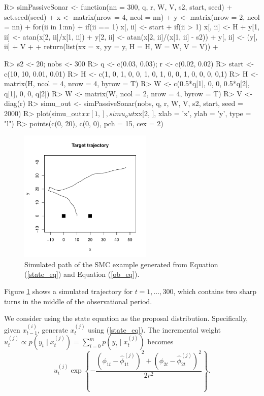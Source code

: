 \begin{example}
R> simPassiveSonar <- function(nn = 300, q, r, W, V, s2, start, seed){
+    set.seed(seed)
+    x <- matrix(nrow = 4, ncol = nn)
+    y <- matrix(nrow = 2, ncol = nn)
+    for(ii in 1:nn){    
+      if(ii == 1) x[, ii] <- start
+      if(ii > 1) x[, ii] <- H%
+      y[1, ii] <- atan(x[2, ii]/x[1, ii])
+      y[2, ii] <- atan(x[2, ii]/(x[1, ii] - s2))
+      y[, ii] <- (y[, ii] + V%
+    }
+    return(list(xx = x, yy = y, H = H, W = W, V = V))
+  }

R> s2 <- 20; nobs <- 300  
R> q <- c(0.03, 0.03); r <- c(0.02, 0.02)
R> start <- c(10, 10, 0.01, 0.01)
R> H <- c(1, 0, 1, 0, 0, 1, 0, 1, 0, 0, 1, 0, 0, 0,  0,1)
R> H <- matrix(H, ncol = 4, nrow = 4, byrow = T)
R> W <- c(0.5*q[1], 0, 0, 0.5*q[2], q[1], 0, 0, q[2])
R> W <- matrix(W, ncol = 2, nrow = 4, byrow = T)
R> V <- diag(r)
R> simu_out <- simPassiveSonar(nobs, q, r, W, V, s2, start, seed = 2000)
R> plot(simu_out$xx[1, ], simu_out$xx[2, ], xlab = 'x', ylab = 'y', type = "l")
R> points(c(0, 20), c(0, 0), pch = 15, cex = 2)
\end{example}
\begin{figure}\label{SMC1}
\centering
\includegraphics[width=2.5in]{SMC1.pdf}
\caption{Simulated path of the SMC example generated from Equation (\ref{state_eq}) and Equation (\ref{ob_eq}).}
\label{fig:SMC}
\end{figure}


Figure \ref{fig:SMC} shows a simulated trajectory for $t=1,\ldots, 300$, which contains two sharp turns in the middle of the observational period. 


We consider using the state equation as the proposal distribution. Specifically, given $x_{t-1}^{(i)}$, generate $x_t^{(j)}$ using (\ref{state_eq}). The incremental weight $u_t^{(j)} \propto p(y_t \mid x_t^{(j)})=\sum_{i=0}^m p(y_t \mid x_t^{(j)})$ becomes
\[
u_t^{(j)} \exp \left\{- \frac{(\phi_{1t}-\hat{\phi}_{1t}^{(j)})^2 +(\phi_{2t}-\hat{\phi}_{2t}^{(j)})^2}{2 r^2} \right\}.
\]

